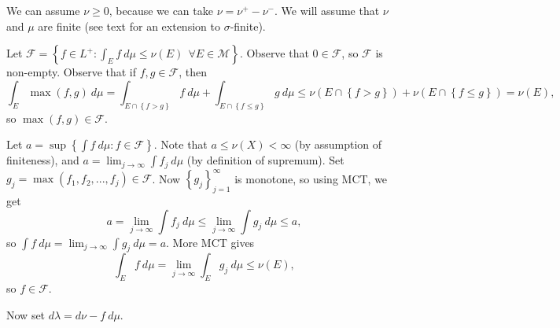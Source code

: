 \documentclass[11pt]{article}
\theoremstyle{definition}
\newcommand{\set}[1]{\left\{ #1 \right\}}
\newcommand{\m}[1]{\mathcal{#1}}
\begin{document}
\proof
We can assume $\nu\ge0$, because we can take $\nu=\nu^+-\nu^-$. 
We will assume that $\nu$ and $\mu$ are finite (see text for an extension to
$\sigma$-finite). 

Let $\m{F}=\set{f\in L^+ : \int_Ef~d\mu \le \nu(E) ~~\forall E\in\m{M}}$. Observe that
$0\in\m{F}$, so $\m{F}$ is non-empty. Observe that if $f,g\in\m{F}$, then 
\[
  \int_E\max(f,g)~d\mu = \int_{E\cap\set{f>g}}f~d\mu+\int_{E\cap\set{f\le g}}g~d\mu
  \le \nu(E\cap\set{f>g}) + \nu(E\cap\set{f\le g}) = \nu(E) ,
\]
so $\max(f,g)\in\m{F}$. 

Let $a=\sup\set{\int f~d\mu : f\in\m{F}}$. Note that $a\le\nu(X)<\infty$ (by assumption of
finiteness), and $a=\lim_{j\to\infty}\int f_j~d\mu$ (by definition of supremum). Set
$g_j=\max(f_1,f_2,...,f_j)\in\m{F}$. Now $\set{g_j}_{j=1}^\infty$ is monotone, so using
MCT, we get 
\[
  a = \lim_{j\to\infty}\int f_j~d\mu \le \lim_{j\to\infty}\int g_j~d\mu \le a ,
\]
so $\int f~d\mu = \lim_{j\to\infty}\int g_j~d\mu = a$. More MCT gives
\[
  \int_Ef~d\mu=\lim_{j\to\infty}\int_Eg_j~d\mu\le\nu(E) ,
\]
so $f\in\m{F}$.

Now set $d\lambda = d\nu - f~d\mu$. 


\qedhere



\end{document}
